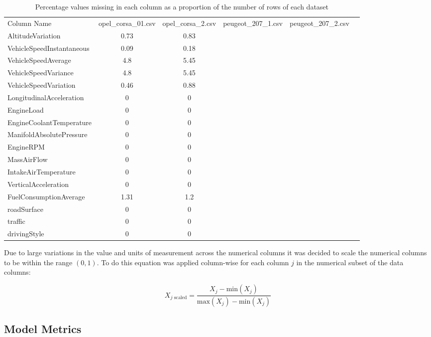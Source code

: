 \documentclass[a4paper,11pt]{article}
\begin{document}
\begin{table}[!ht]
	\caption{Percentage values missing in each column as a proportion of the number of rows of each dataset}\label{tab:column_types}
	\centering
	\begin{tabular}{lccccc}\toprule
		Column Name & opel\_corsa\_01.csv & opel\_corsa\_2.csv & peugeot\_207\_1.csv & peugeot\_207\_2.csv \\ 
		AltitudeVariation & 0.73 & 0.83 \\ 
		VehicleSpeedInstantaneous & 0.09 & 0.18 \\ 
		VehicleSpeedAverage & 4.8 & 5.45 \\ 
		VehicleSpeedVariance & 4.8 & 5.45 \\ 
		VehicleSpeedVariation & 0.46 & 0.88 \\ 
		LongitudinalAcceleration & 0 & 0 \\ 
		EngineLoad & 0 & 0 \\ 
		EngineCoolantTemperature & 0 & 0 \\ 
		ManifoldAbsolutePressure & 0 & 0 \\ 
		EngineRPM & 0 & 0 \\ 
		MassAirFlow & 0 & 0 \\ 
		IntakeAirTemperature & 0 & 0 \\ 
		VerticalAcceleration & 0 & 0 \\ 
		FuelConsumptionAverage & 1.31 & 1.2 \\ 
		roadSurface & 0 & 0 \\ 
		traffic & 0 & 0 \\ 
		drivingStyle & 0 & 0 \\ \bottomrule
	\end{tabular}
\end{table}

Due to large variations in the value and units of measurement across the numerical columns it was decided to scale the numerical columns to be within the range $(0,1)$. To do this equation was applied column-wise for each column $j$ in the numerical subset of the data columns:

\begin{equation}
	X_{j \text{ scaled}} = \frac{X_{j}-\text{min}(X_{j})}{\text{max}(X_{j})-\text{min}(X_{j})}
\end{equation}

\subsection{Model Metrics}
\end{document}

